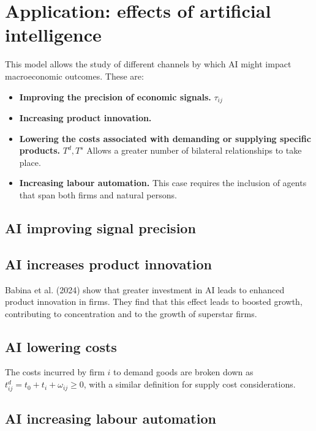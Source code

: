 \documentclass[
]{article}
\theoremstyle{definition}
\theoremstyle{plain}
\theoremstyle{remark}
\begin{document}
\section{Application: effects of artificial intelligence}\label{sec-AI}

This model allows the study of different channels by which AI might
impact macroeconomic outcomes. These are:

\begin{itemize}
\item
  \textbf{Improving the precision of economic signals.} \(\tau_{ij}\)
\item
  \textbf{Increasing product innovation.}
\item
  \textbf{Lowering the costs associated with demanding or supplying
  specific products.} \(T^d, T^s\) Allows a greater number of bilateral
  relationships to take place.
\item
  \textbf{Increasing labour automation.} This case requires the
  inclusion of agents that span both firms and natural persons.
\end{itemize}

\subsection{AI improving signal
precision}\label{ai-improving-signal-precision}

\subsection{AI increases product
innovation}\label{ai-increases-product-innovation}

Babina et al. (2024) show that greater investment in AI leads to
enhanced product innovation in firms. They find that this effect leads
to boosted growth, contributing to concentration and to the growth of
superstar firms.

\subsection{AI lowering costs}\label{ai-lowering-costs}

The costs incurred by firm \(i\) to demand goods are broken down as
\(t_{ij}^d = t_0 + t_i + \omega_{ij} \geq 0\), with a similar definition
for supply cost considerations.

\subsection{AI increasing labour
automation}\label{ai-increasing-labour-automation}
\end{document}
